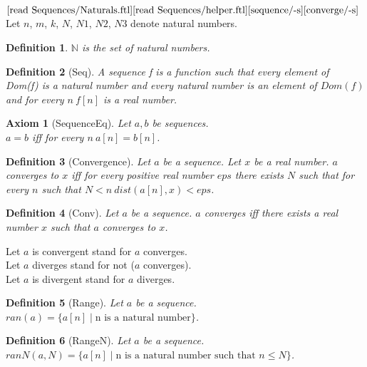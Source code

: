 \documentclass{article}
\newenvironment{forthel}{\begin{leftbar}}{\end{leftbar}}
\newtheorem{axiom}{Axiom}
\newtheorem{definition}{Definition}
\newcommand{\NN}{\mathbb{N}}
\begin{document}
\begin{forthel}
	\noindent $\text{[read Sequences/Naturals.ftl]}\\
	\text{[read Sequences/helper.ftl]}\\
	\text{[sequence/-s]}\\
	\text{[converge/-s]}$\\
	Let $n$, $m$, $k$, $N$, $N1$, $N2$, $N3$ denote natural numbers.
	
	\begin{definition}
		$\NN$ is the set of natural numbers.
	\end{definition}
	
	\begin{definition}[Seq]	A sequence f is a function such that every element of Dom(f) is a natural number and every
	natural number is an element of $Dom(f)$ and for every $n \ f[n]$ is a real number.
	\end{definition}
	
	\begin{axiom}[SequenceEq] Let $a, b$ be sequences. \\ $a = b$ iff for every $n \ a[n] = b[n]$.
	\end{axiom}
	
	\begin{definition}[Convergence] Let $a$ be a sequence. Let $x$ be a real number. $a$ converges to $x$ iff for every positive real
	number $eps$ there exists $N$ such that for every $n$ such that $N < n \ dist(a[n],x) < eps$.
	\end{definition}
	
	\begin{definition}[Conv] Let $a$ be a sequence. $a$ converges iff there exists a real number $x$ such that $a$ converges to $x$.
	\end{definition}
	
	\noindent Let $a$ is convergent stand for $a$ converges.
	\\Let $a$ diverges stand for not ($a$ converges).
	\\Let $a$ is divergent stand for $a$ diverges.
	
	\begin{definition}[Range] Let $a$ be a sequence. $ran(a) = \{a[n] \mid \text{n is a natural number} \}$. 
	\end{definition}

	\begin{definition}[RangeN] Let $a$ be a sequence. $ranN(a,N) = \{a[n] \mid \text{n is a natural number such that } n \leq N\}$. 
	\end{definition}
	

\end{forthel}
\end{document}
